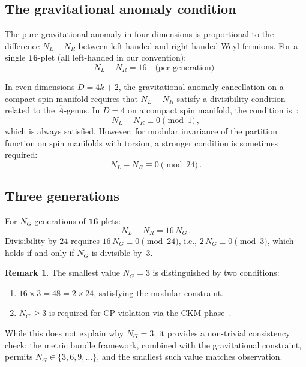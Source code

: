 \documentclass[12pt,a4paper]{article}
\theoremstyle{definition}
\newtheorem{remark}[theorem]{Remark}
\begin{document}
\subsection{The gravitational anomaly condition}

The pure gravitational anomaly in four dimensions is proportional to the difference $N_L - N_R$ between left-handed and right-handed Weyl fermions.
For a single $\mathbf{16}$-plet (all left-handed in our convention):
\begin{equation}
N_L - N_R = 16 \quad\text{(per generation)}\,.
\end{equation}

In even dimensions $D = 4k + 2$, the gravitational anomaly cancellation on a compact spin manifold requires that $N_L - N_R$ satisfy a divisibility condition related to the $\hat{A}$-genus.
In $D = 4$ on a compact spin manifold, the condition is~\cite{AlvarezGaume1984}:
\begin{equation}
N_L - N_R \equiv 0 \pmod{1}\,,
\end{equation}
which is always satisfied.
However, for modular invariance of the partition function on spin manifolds with torsion, a stronger condition is sometimes required:
\begin{equation}
N_L - N_R \equiv 0 \pmod{24}\,.
\end{equation}

\subsection{Three generations}

For $N_G$ generations of $\mathbf{16}$-plets:
\begin{equation}
N_L - N_R = 16\, N_G\,.
\end{equation}
Divisibility by $24$ requires $16\, N_G \equiv 0 \pmod{24}$, i.e., $2\, N_G \equiv 0 \pmod{3}$, which holds if and only if $N_G$ is divisible by~$3$.

\begin{remark}
The smallest value $N_G = 3$ is distinguished by two conditions:
\begin{enumerate}[nosep]
\item $16 \times 3 = 48 = 2 \times 24$, satisfying the modular constraint.
\item $N_G \geq 3$ is required for CP violation via the CKM phase~\cite{KobayashiMaskawa1973}.
\end{enumerate}
While this does not explain why $N_G = 3$, it provides a non-trivial consistency check: the metric bundle framework, combined with the gravitational constraint, permits $N_G \in \{3, 6, 9, \ldots\}$, and the smallest such value matches observation.
\end{remark}
\end{document}

